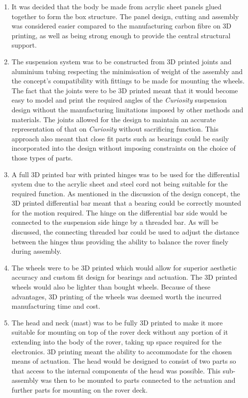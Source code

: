     \begin{enumerate}[label=\Alph*.]
      \item It was decided that the body be made from acrylic sheet panels glued together to form the box structure. The panel design, cutting and assembly was considered easier compared to the manufacturing carbon fibre on 3D printing, as well as being strong enough to provide the central structural support.
      \item The suspension system was to be constructed from 3D printed joints and aluminium tubing respecting the minimisation of weight of the assembly and the concept's compatibility with fittings to be made for mounting the wheels. The fact that the joints were to be 3D printed meant that it would become easy to model and print the required angles of the \textit{Curiosity} suspension design without the manufacturing limitations imposed by other methods and materials. The joints allowed for the design to maintain an accurate representation of that on \textit{Curiosity} without sacrificing function. This approach also meant that close fit parts such as bearings could be easily incorporated into the design without imposing constraints on the choice of those types of parts.
      \item A full 3D printed bar with printed hinges was to be used for the differential system due to the acrylic sheet and steel cord not being suitable for the required function. As mentioned in the discussion of the design concept, the 3D printed differential bar meant that a bearing could be correctly mounted for the motion required. The hinge on the differential bar side would be connected to the suspension side hinge by a threaded bar. As will be discussed, the connecting threaded bar could be used to adjust the distance between the hinges thus providing the ability to balance the rover finely during assembly.
      \item The wheels were to be 3D printed which would allow for superior aesthetic accuracy and custom fit design for bearings and actuation. The 3D printed wheels would also be lighter than bought wheels. Because of these advantages, 3D printing of the wheels was deemed worth the incurred manufacturing time and cost.
      \item The head and neck (mast) was to be fully 3D printed to make it more suitable for mounting on top of the rover deck without any portion of it extending into the body of the rover, taking up space required for the electronics. 3D printing meant the ability to accommodate for the chosen means of actuation. The head would be designed to consist of two parts so that access to the internal components of the head was possible. This sub-assembly was then to be mounted to parts connected to the actuation and further parts for mounting on the rover deck.

\end{enumerate}

